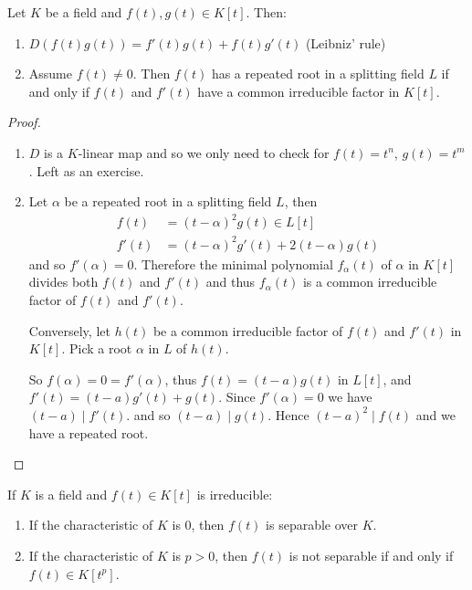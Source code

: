 \documentclass{article}
\begin{document}
\begin{nlemma}\label{lem:2.3}
    Let $K$ be a field and $f(t), g(t) \in K[t]$. Then:
    \begin{enumerate}[label=(\alph*)]
        \item $D(f(t) g(t)) = f'(t) g(t) + f(t) g'(t)$ (Leibniz' rule)
        \item Assume $f(t) \neq 0$. Then $f(t)$ has a repeated root in a splitting field $L$ if and only if $f(t)$ and $f'(t)$ have a common irreducible factor in $K[t]$.
    \end{enumerate}
\end{nlemma}
\begin{proof}
    \leavevmode
    \begin{enumerate}[label=(\alph*)]
        \item $D$ is a $K$-linear map and so we only need to check for $f(t) = t^n$, $g(t) = t^m$. Left as an exercise.
        \item Let $\alpha$ be a repeated root in a splitting field $L$, then
            \begin{align*}
                f(t) &= (t-\alpha)^2 g(t) \in L[t] \\
                f'(t) &= (t-\alpha)^2 g'(t) + 2(t-\alpha) g(t)
            \end{align*}
            and so $f'(\alpha) = 0$.
            Therefore the minimal polynomial $f_\alpha(t)$ of $\alpha$ in $K[t]$ divides both $f(t)$ and $f'(t)$ and thus $f_\alpha(t)$ is a common irreducible factor of $f(t)$ and $f'(t)$.


            Conversely, let $h(t)$ be a common irreducible factor of $f(t)$ and $f'(t)$ in $K[t]$.
            Pick a root $\alpha$ in $L$ of $h(t)$.

            So $f(\alpha) = 0 = f'(\alpha)$, thus $f(t) = (t-a) g(t)$ in $L[t]$, and $f'(t) = (t-a) g'(t) + g(t)$.
            Since $f'(\alpha)  = 0$ we have $(t-a) \mid f'(t)$. and so $(t-a) \mid g(t)$. Hence $(t-a)^2 \mid f(t)$ and we have a repeated root. \qedhere
    \end{enumerate}
\end{proof}
\begin{ncor}\label{cor:2.4}
    If $K$ is a field and $f(t) \in K[t]$ is irreducible:
    \begin{enumerate}[label=(\roman*)]
        \item If the characteristic of $K$ is 0, then $f(t)$ is separable over $K$.
        \item If the characteristic of $K$ is $p>0$, then $f(t)$ is not separable if and only if $f(t) \in K[t^p]$.
    \end{enumerate}
\end{ncor}
\end{document}
